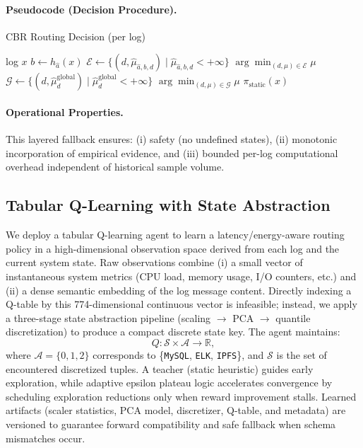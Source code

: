\paragraph{Pseudocode (Decision Procedure).}
\begin{algorithm}[H]
\caption{CBR Routing Decision (per log)}
\label{alg:cbr-decision}
\begin{algorithmic}[1]
\Require log $x$
   \State $b \gets h_{\hat{a}}(x)$
   \State $\mathcal{E} \gets \{ (d, \widehat{\mu}_{\hat{a},b,d}) \mid \widehat{\mu}_{\hat{a},b,d} < +\infty \}$
       \State \Return $\arg\min_{(d,\mu)\in \mathcal{E}} \mu$
   \EndIf
\EndIf
\State $\mathcal{G} \gets \{ (d, \widehat{\mu}^{\text{global}}_d) \mid \widehat{\mu}^{\text{global}}_d < +\infty \}$
   \State \Return $\arg\min_{(d,\mu)\in \mathcal{G}} \mu$
\EndIf
\State \Return $\pi_{\text{static}}(x)$
\end{algorithmic}
\end{algorithm}

\paragraph{Operational Properties.}
This layered fallback ensures: (i) safety (no undefined states), (ii) monotonic incorporation of empirical evidence, and (iii) bounded per-log computational overhead independent of historical sample volume.

\subsection{Tabular Q-Learning with State Abstraction}
\label{subsec:qlearning}

We deploy a tabular Q-learning agent to learn a latency/energy-aware routing policy in a high-dimensional observation space derived from each log and the current system state. Raw observations combine (i) a small vector of instantaneous system metrics (CPU load, memory usage, I/O counters, etc.) and (ii) a dense semantic embedding of the log message content. Directly indexing a Q-table by this 774-dimensional continuous vector is infeasible; instead, we apply a three-stage state abstraction pipeline (scaling $\rightarrow$ PCA $\rightarrow$ quantile discretization) to produce a compact discrete state key. The agent maintains:
\[
Q: \mathcal{S} \times \mathcal{A} \rightarrow \mathbb{R},
\]
where $\mathcal{A} = \{0,1,2\}$ corresponds to \{\texttt{MySQL}, \texttt{ELK}, \texttt{IPFS}\}, and $\mathcal{S}$ is the set of encountered discretized tuples. A teacher (static heuristic) guides early exploration, while adaptive epsilon plateau logic accelerates convergence by scheduling exploration reductions only when reward improvement stalls. Learned artifacts (scaler statistics, PCA model, discretizer, Q-table, and metadata) are versioned to guarantee forward compatibility and safe fallback when schema mismatches occur.

